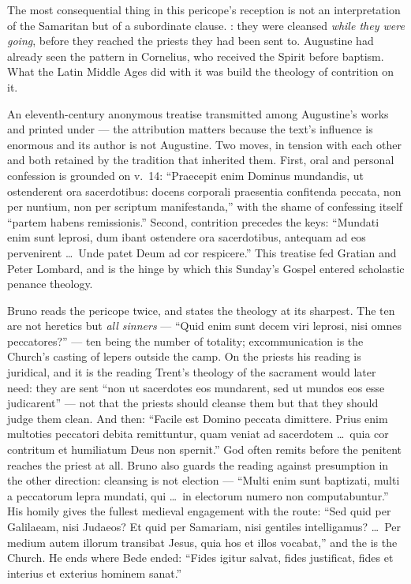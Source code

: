 The most consequential thing in this pericope's reception is not an
interpretation of the Samaritan but of a subordinate clause. : they were cleansed \textit{while they were
going}, before they reached the priests they had been sent to. Augustine had
already seen the pattern in Cornelius, who received the Spirit before baptism.
What the Latin Middle Ages did with it was build the theology of contrition on
it.

\begin{witnessnote}
An eleventh-century anonymous treatise transmitted among Augustine's works and
printed under  --- the attribution matters because the
text's influence is enormous and its author is not Augustine. Two
moves, in tension with each other and both retained by the tradition that
inherited them. First, oral and personal confession is grounded on v.~14:
``Praecepit enim Dominus mundandis, ut ostenderent ora sacerdotibus: docens
corporali praesentia confitenda peccata, non per nuntium, non per scriptum
manifestanda,'' with the shame of confessing itself ``partem habens
remissionis.'' Second, contrition precedes the keys: ``Mundati enim sunt
leprosi, dum ibant ostendere ora sacerdotibus, antequam ad eos pervenirent
\dots\ Unde patet Deum ad cor respicere.'' This treatise fed Gratian and Peter
Lombard, and is the hinge by which this Sunday's Gospel entered scholastic
penance theology.
\end{witnessnote}

\begin{witnessnote}
Bruno reads the pericope twice, and states the  theology at its
sharpest. The ten are not heretics but \textit{all sinners} --- ``Quid enim sunt
decem viri leprosi, nisi omnes peccatores?'' --- ten being the number of
totality; excommunication is the Church's casting of lepers outside the camp.
On the priests his reading is juridical, and it is the reading Trent's
theology of the sacrament would later need: they are sent ``non ut sacerdotes
eos mundarent, sed ut mundos eos esse judicarent'' --- not that the priests
should cleanse them but that they should judge them clean. And then: ``Facile
est Domino peccata dimittere. Prius enim multoties peccatori debita remittuntur,
quam veniat ad sacerdotem \dots\ quia cor contritum et humiliatum Deus non
spernit.'' God often remits before the penitent reaches the priest at all.
Bruno also guards the reading against presumption in the other direction:
cleansing is not election --- ``Multi enim sunt baptizati, multi a peccatorum
lepra mundati, qui \dots\ in electorum numero non computabuntur.'' His homily
gives the fullest medieval engagement with the route: ``Sed quid per
Galilaeam, nisi Judaeos? Et quid per Samariam, nisi gentiles intelligamus?
\dots\ Per medium autem illorum transibat Jesus, quia hos et illos vocabat,''
and the  is the Church. He ends where Bede ended: ``Fides
igitur salvat, fides justificat, fides et interius et exterius hominem sanat.''
\end{witnessnote}

